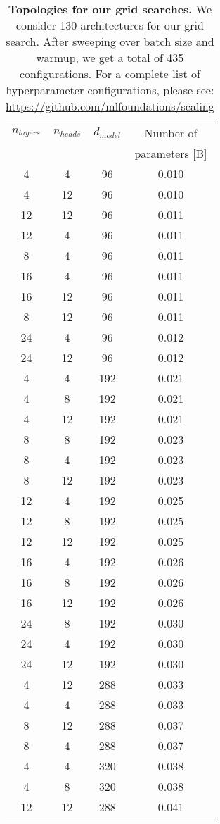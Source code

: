 \begin{table}[tp]
\tiny
\centering
\caption{\textbf{Topologies for our grid searches.} We consider 130 architectures for our grid search. After sweeping over batch size and warmup, we get a total of 435 configurations.
For a complete list of hyperparameter configurations, please see: \url{https://github.com/mlfoundations/scaling}
}
\begin{tabular}{cccc}
\toprule
$n_{layers}$ & $n_{heads}$ & $d_{model}$ & Number of \\
 & & & parameters [B]\\
\midrule
4 & 4 & 96 & 0.010\\
4 & 12 & 96 & 0.010\\
12 & 12 & 96 & 0.011\\
12 & 4 & 96 & 0.011\\
8 & 4 & 96 & 0.011\\
16 & 4 & 96 & 0.011\\
16 & 12 & 96 & 0.011\\
8 & 12 & 96 & 0.011\\
24 & 4 & 96 & 0.012\\
24 & 12 & 96 & 0.012\\
4 & 4 & 192 & 0.021\\
4 & 8 & 192 & 0.021\\
4 & 12 & 192 & 0.021\\
8 & 8 & 192 & 0.023\\
8 & 4 & 192 & 0.023\\
8 & 12 & 192 & 0.023\\
12 & 4 & 192 & 0.025\\
12 & 8 & 192 & 0.025\\
12 & 12 & 192 & 0.025\\
16 & 4 & 192 & 0.026\\
16 & 8 & 192 & 0.026\\
16 & 12 & 192 & 0.026\\
24 & 8 & 192 & 0.030\\
24 & 4 & 192 & 0.030\\
24 & 12 & 192 & 0.030\\
4 & 12 & 288 & 0.033\\
4 & 4 & 288 & 0.033\\
8 & 12 & 288 & 0.037\\
8 & 4 & 288 & 0.037\\
4 & 4 & 320 & 0.038\\
4 & 8 & 320 & 0.038\\
12 & 12 & 288 & 0.041\\

\end{tabular}
\end{table}

